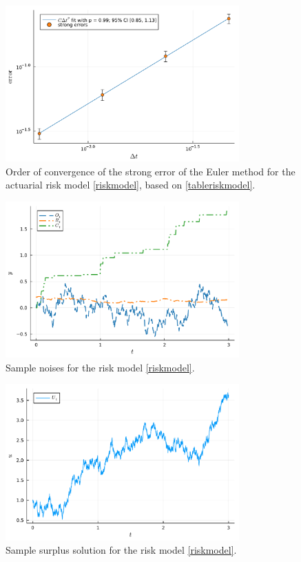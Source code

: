 \documentclass[reqno,12pt]{amsart}
\theoremstyle{plain} %
\theoremstyle{definition} %
\begin{document}
\begin{figure}[htb]
    \centerline{\includegraphics[width=0.8\textwidth]{img/order_riskmodel.pdf}}
    \caption{Order of convergence of the strong error of the Euler method for the actuarial risk model \cref{riskmodel}, based on \cref{tableriskmodel}.}
    \label{figriskmodel}
\end{figure}

\begin{figure}[htb]
    \centerline{\includegraphics[width=0.8\textwidth]{img/riskmodel_noises.pdf}}
    \caption{Sample noises for the risk model \cref{riskmodel}.}
    \label{figriskmodelnoise}
\end{figure}

\begin{figure}[htb]
    \centerline{\includegraphics[width=0.8\textwidth]{img/riskmodel_surplus.pdf}}
    \caption{Sample surplus solution for the risk model \cref{riskmodel}.}
    \label{figriskmodelsurplus}
\end{figure}
\end{document}
